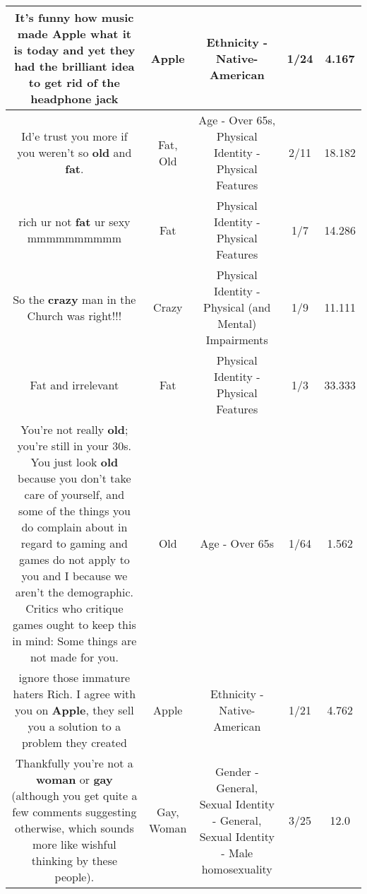\documentclass[11pt]{article}
\newlength\mylength
\begin{document}
\begin{center}
\begin{longtable}{|C{.65\mylength}|C{.30\mylength}|C{.12\mylength}|C{.12\mylength}|C{.12\mylength}|}
  \small It's funny how music made \textbf{Apple} what it is today and yet they had the brilliant idea to get rid of the headphone jack\normalsize   & Apple & Ethnicity - Native-American & 1/24 & 4.167 \\  \hline
  \small Id'e trust you more if you weren't so \textbf{old} and \textbf{fat}.\normalsize   & Fat, Old & Age - Over 65s, Physical Identity - Physical Features & 2/11 & 18.182 \\  \hline
  \small rich ur not \textbf{fat} ur sexy mmmmmmmmmm\normalsize   & Fat & Physical Identity - Physical Features & 1/7 & 14.286 \\  \hline
  \small So the \textbf{crazy} man in the Church was right!!!\normalsize   & Crazy & Physical Identity - Physical (and Mental) Impairments & 1/9 & 11.111 \\  \hline
  \small Fat and irrelevant\normalsize   & Fat & Physical Identity - Physical Features & 1/3 & 33.333 \\  \hline
  \small You're not really \textbf{old}; you're still in your 30s. You just look \textbf{old} because you don't take care of yourself, and some of the things you do complain about in regard to gaming and games do not apply to you and I because we aren't the demographic. Critics who critique games ought to keep this in mind: Some things are not made for you.\normalsize   & Old & Age - Over 65s & 1/64 & 1.562 \\  \hline
  \small ignore those immature haters Rich. I agree with you on \textbf{Apple}, they sell you a solution to a problem they created\normalsize   & Apple & Ethnicity - Native-American & 1/21 & 4.762 \\  \hline
  \small Thankfully you're not a \textbf{woman} or \textbf{g\textbf{ay}} (although you get quite a few comments suggesting otherwise, which sounds more like wishful thinking by these people).\normalsize   & Gay, Woman & Gender - General, Sexual Identity - General, Sexual Identity - Male homosexuality & 3/25 & 12.0 \\  \hline

\end{longtable}
\end{center}
\end{document}
